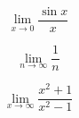 \documentclass{article}
\begin{document}
\[
\lim_{x\to 0} \frac{\sin x}{x}
\]

\[
\lim_{n\to\infty} \frac{1}{n}
\]

\[
\lim_{x\to\infty} \frac{x^2+1}{x^2-1}
\]
\end{document}
